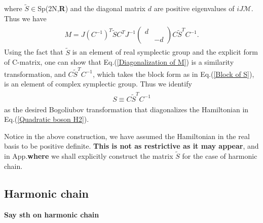 where $\tilde{S}\in$Sp(2N,{\bf R}) and the diagonal matrix $d$ are positive eigenvalues of $iJ\mathcal{M}$. Thus we have
\begin{eqnarray}\begin{aligned}
\label{Diagonalization of M}
M=J(C^{-1})^T\tilde{S}C^TJ^{-1}\left(\begin{array}{ccc}
d\\
&-d
\end{array}\right)C\tilde{S}^TC^{-1}.
\end{aligned}\end{eqnarray}
Using the fact that $\tilde{S}$ is an element of real symplectic group and the explicit form of C-matrix, one can show that Eq.(\ref{Diagonalization of M}) is a similarity transformation, and $C\tilde{S}^TC^{-1}$, which takes the block form as in Eq.(\ref{Block of S}), is an element of complex symplectic group. Thus we identify 
\begin{eqnarray*}\begin{aligned}
S\equiv C\tilde{S}^TC^{-1}
\end{aligned}\end{eqnarray*}
as the desired Bogoliubov transformation that diagonalizes the Hamiltonian in Eq.(\ref{Quadratic boson H2}). 

Notice in the above construction, we have assumed the Hamiltonian in the real basis to be positive definite. {\bf\color{red}This is not as restrictive as it may appear}, and in App.{\bf\color{red}where} we shall explicitly construct the matrix $\tilde{S}$ for the case of harmonic chain.
\subsection{Harmonic chain}

{\bf\color{red}Say sth on harmonic chain}

